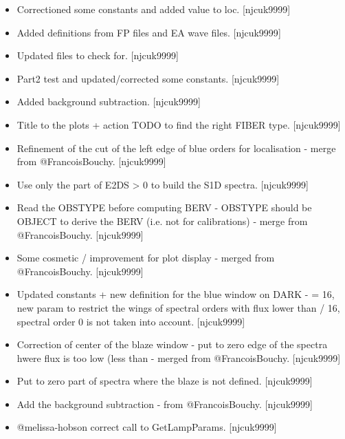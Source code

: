 \documentclass[a4paper,10pt,english]{report}
\begin{document}
\label{\detokenize{misc/changelog:id377}}\begin{itemize}
\item {} 
Correctioned some constants and added value to loc. {[}njcuk9999{]}

\item {} 
Added definitions from FP files and EA wave files. {[}njcuk9999{]}

\item {} 
Updated  files to check for. {[}njcuk9999{]}

\item {} 
Part2 test and updated/corrected some constants. {[}njcuk9999{]}

\item {} 
Added background subtraction. {[}njcuk9999{]}

\item {} 
Title to the plots + action TODO to find the right FIBER type.
{[}njcuk9999{]}

\item {} 
Refinement of the cut of the left edge of blue orders for localisation
- merge from @FrancoisBouchy. {[}njcuk9999{]}

\item {} 
Use only the part of E2DS \textgreater{} 0 to build the S1D spectra. {[}njcuk9999{]}

\item {} 
Read the OBSTYPE before computing BERV - OBSTYPE should be OBJECT to
derive the BERV (i.e. not for calibrations) - merge from
@FrancoisBouchy. {[}njcuk9999{]}

\item {} 
Some cosmetic / improvement for plot display - merged from
@FrancoisBouchy. {[}njcuk9999{]}

\item {} 
Updated constants + new definition for the blue window on DARK -
 = 16, new param to restrict the wings of spectral
orders with flux lower than  / 16, spectral order 0 is
not taken into account. {[}njcuk9999{]}

\item {} 
Correction of center of the blaze window - put to zero edge of the
spectra hwere flux is too low (less than 
 - merged from @FrancoisBouchy. {[}njcuk9999{]}

\item {} 
Put to zero part of spectra where the blaze is not defined.
{[}njcuk9999{]}

\item {} 
Add the background subtraction - from @FrancoisBouchy. {[}njcuk9999{]}

\item {} 
@melissa-hobson correct call to GetLampParams. {[}njcuk9999{]}

\end{itemize}
\end{document}
